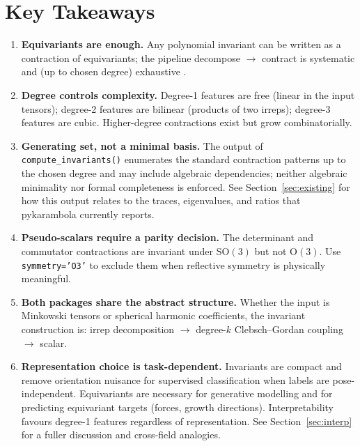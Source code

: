 \documentclass[11pt,a4paper]{article}
\begin{document}
\section{Key Takeaways}
\label{sec:takeaways}

\begin{enumerate}
  \item \textbf{Equivariants are enough.}  Any polynomial invariant can be
        written as a contraction of equivariants; the pipeline decompose $\to$
        contract is systematic and (up to chosen degree) exhaustive
        \cite{KondorTrivedi2018}.

  \item \textbf{Degree controls complexity.}
        Degree-1 features are free (linear in the input tensors);
        degree-2 features are bilinear (products of two irreps);
        degree-3 features are cubic.
        Higher-degree contractions exist but grow combinatorially.

  \item \textbf{Generating set, not a minimal basis.}
        The output of \texttt{compute\_invariants()} enumerates the standard
        contraction patterns up to the chosen degree and may include algebraic
        dependencies; neither algebraic minimality nor formal completeness is enforced.
        See Section~\ref{sec:existing} for how this output relates to the traces,
        eigenvalues, and ratios that pykarambola currently reports.

  \item \textbf{Pseudo-scalars require a parity decision.}
        The determinant and commutator contractions are invariant under
        $\mathrm{SO}(3)$ but not $\mathrm{O}(3)$.
        Use \texttt{symmetry='O3'} to exclude them when reflective symmetry is
        physically meaningful.

  \item \textbf{Both packages share the abstract structure.}
        Whether the input is Minkowski tensors or spherical harmonic coefficients,
        the invariant construction is: irrep decomposition $\to$ degree-$k$
        Clebsch--Gordan coupling $\to$ scalar.

  \item \textbf{Representation choice is task-dependent.}
        Invariants are compact and remove orientation nuisance for supervised
        classification when labels are pose-independent.
        Equivariants are necessary for generative modelling and for predicting
        equivariant targets (forces, growth directions).
        Interpretability favours degree-1 features regardless of representation.
        See Section~\ref{sec:interp} for a fuller discussion and cross-field analogies.
\end{enumerate}



\end{document}
